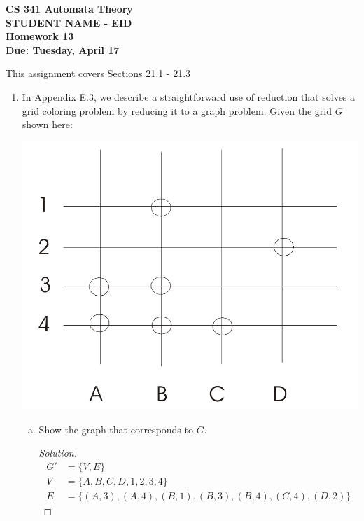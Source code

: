\documentclass[10pt]{article}
\begin{document}
\begin{flushleft}
\textbf{\noindent
CS 341 Automata Theory \\
STUDENT NAME - EID\\
Homework 13 \\
Due: Tuesday, April 17}\\
\end{flushleft}

\noindent
This assignment covers Sections 21.1 - 21.3\\

\begin{enumerate}[1)]


\item
In Appendix E.3, we describe a straightforward use of reduction that solves a grid coloring problem by reducing it to a graph problem.  Given the grid $G$ shown here:
\begin{center}
\includegraphics[scale=.15]{images/p1.png}
\end{center}
\begin{enumerate}[a)]

\item
Show the graph that corresponds to $G$.
\begin{proof}[Solution]
\begin{align*}
G' &= \{V, E\}\\
V &= \{A, B, C, D, 1, 2, 3, 4\}\\
E &= \{(A, 3), (A, 4), (B, 1), (B, 3), (B, 4), (C, 4), (D, 2)\}
\end{align*}
\end{proof}


\end{enumerate}
\end{enumerate}
\end{document}
